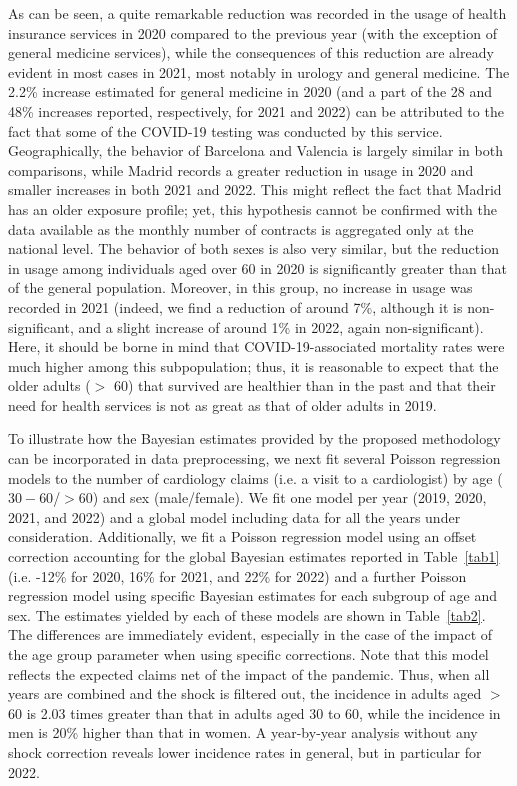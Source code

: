 \documentclass[]{risa}
\begin{document}
As can be seen, a quite remarkable reduction was recorded in the usage of health insurance services in 2020 compared to the previous year (with the exception of general medicine services), while the consequences of this reduction are already evident in most cases in 2021, most notably in urology and general medicine. The 2.2\% increase estimated for general medicine in 2020 (and a part of the 28 and 48\% increases reported, respectively, for 2021 and 2022) can be attributed to the fact that some of the COVID-19 testing was conducted by this service. Geographically, the behavior of Barcelona and Valencia is largely similar in both comparisons, while Madrid records a greater reduction in usage in 2020 and smaller increases in both 2021 and 2022. This might reflect the fact that Madrid has an older exposure profile; yet, this hypothesis cannot be confirmed with the data available as the monthly number of contracts is aggregated only at the national level. The behavior of both sexes is also very similar, but the reduction in usage among individuals aged over 60 in 2020 is significantly greater than that of the general population. Moreover, in this group, no increase in usage was recorded in 2021 (indeed, we find a reduction of around 7\%, although it is non-significant, and a slight increase of around 1\% in 2022, again non-significant). Here, it should be borne in mind that COVID-19-associated mortality rates were much higher among this subpopulation; thus, it is reasonable to expect that the older adults ($>$ 60) that survived are healthier than in the past and that their need for health services is not as great as that of older adults in 2019.


To illustrate how the Bayesian estimates provided by the proposed methodology can be incorporated in data preprocessing, we next fit several Poisson regression models to the number of cardiology claims (i.e. a visit to a cardiologist) by age ($30-60$/$>60$) and sex (male/female). We fit one model per year (2019, 2020, 2021, and 2022) and a global model including data for all the years under consideration. Additionally, we fit a Poisson regression model using an offset correction accounting for the global Bayesian estimates reported in Table~\ref{tab1} (i.e. -12\% for 2020, 16\% for 2021, and 22\% for 2022) and a further Poisson regression model using specific Bayesian estimates for each subgroup of age and sex. The estimates yielded by each of these models are shown in Table~\ref{tab2}. The differences are immediately evident, especially in the case of the impact of the age group parameter when using specific corrections. Note that this model reflects the expected claims net of the impact of the pandemic. Thus, when all years are combined and the shock is filtered out, the incidence in adults aged $>$ 60 is 2.03 times greater than that in adults aged 30 to 60, while the incidence in men is 20\% higher than that in women. A year-by-year analysis without any shock correction reveals lower incidence rates in general, but in particular for 2022.
\end{document}
